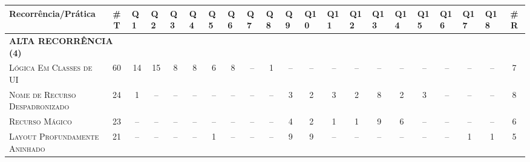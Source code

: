 \begin{table*}
\centering
\footnotesize
\begin{tabular}{@{}p{3.5cm}p{0.3cm}p{.2cm}p{.2cm}p{.2cm}p{.2cm}p{.2cm}p{.2cm}p{.2cm}p{.2cm}p{.2cm}p{.4cm}p{.4cm}p{.4cm}p{.4cm}p{.4cm}p{.4cm}p{.4cm}p{.4cm}p{.4cm}p{0.2cm}@{}}
\toprule
\textbf{Recorrência/Prática} & \multicolumn{1}{c}{\textbf{\#T}} & Q1 & Q2 & Q3 & Q4 & Q5 & Q6 & Q7 & Q8 & Q9 & Q10 & Q11 & Q12 & Q13 & Q14 & Q15 & Q16 & Q17 & Q18 &  \multicolumn{1}{c}{\textbf{\#R}} \\
\hline
\multicolumn{2}{l}{\scriptsize{\textbf{ALTA RECORRÊNCIA (4)}}} \\
\textsc{Lógica Em Classes de UI}					& \multicolumn{1}{c}{60} 	& \multicolumn{1}{c}{14} 	& \multicolumn{1}{c}{15} 	& \multicolumn{1}{c}{8}		& \multicolumn{1}{c}{8}		& \multicolumn{1}{c}{6}		& \multicolumn{1}{c}{8}		& \multicolumn{1}{c}{--}	& \multicolumn{1}{c}{1}		& \multicolumn{1}{c}{--}	& \multicolumn{1}{c}{--}	& \multicolumn{1}{c}{--}	& \multicolumn{1}{c}{--}	& \multicolumn{1}{c}{--}	& \multicolumn{1}{c}{--}	& \multicolumn{1}{c}{--}	& \multicolumn{1}{c}{--}	& \multicolumn{1}{c}{--} 	& \multicolumn{1}{c}{--}	& \multicolumn{1}{c}{7} \\
\textsc{Nome de Recurso Despadronizado}		& \multicolumn{1}{c}{24} 	& \multicolumn{1}{c}{1} 	& \multicolumn{1}{c}{--} 	& \multicolumn{1}{c}{--}	& \multicolumn{1}{c}{--}	& \multicolumn{1}{c}{--}	& \multicolumn{1}{c}{--}	& \multicolumn{1}{c}{--}	& \multicolumn{1}{c}{--}	& \multicolumn{1}{c}{3}		& \multicolumn{1}{c}{2}		& \multicolumn{1}{c}{3}		& \multicolumn{1}{c}{2}		& \multicolumn{1}{c}{8}		& \multicolumn{1}{c}{2}		& \multicolumn{1}{c}{3}		& \multicolumn{1}{c}{--}	& \multicolumn{1}{c}{--} 	& \multicolumn{1}{c}{--}	& \multicolumn{1}{c}{8} \\
\textsc{Recurso Mágico}										& \multicolumn{1}{c}{23} 	& \multicolumn{1}{c}{--} 	& \multicolumn{1}{c}{--} 	& \multicolumn{1}{c}{--}	& \multicolumn{1}{c}{--}	& \multicolumn{1}{c}{--}	& \multicolumn{1}{c}{--}	& \multicolumn{1}{c}{--}	& \multicolumn{1}{c}{--}	& \multicolumn{1}{c}{4}		& \multicolumn{1}{c}{2}		& \multicolumn{1}{c}{1}		& \multicolumn{1}{c}{1}		& \multicolumn{1}{c}{9}		& \multicolumn{1}{c}{6}		& \multicolumn{1}{c}{--}	& \multicolumn{1}{c}{--}	& \multicolumn{1}{c}{--} 	& \multicolumn{1}{c}{--}	& \multicolumn{1}{c}{6} \\
\textsc{Layout Profundamente Aninhado}		& \multicolumn{1}{c}{21} 	& \multicolumn{1}{c}{--} 	& \multicolumn{1}{c}{--} 	& \multicolumn{1}{c}{--}	& \multicolumn{1}{c}{--}	& \multicolumn{1}{c}{1}		& \multicolumn{1}{c}{--}	& \multicolumn{1}{c}{--}	& \multicolumn{1}{c}{--}	& \multicolumn{1}{c}{9}		& \multicolumn{1}{c}{9}		& \multicolumn{1}{c}{--}	& \multicolumn{1}{c}{--}	& \multicolumn{1}{c}{--}	& \multicolumn{1}{c}{--}	& \multicolumn{1}{c}{--}	& \multicolumn{1}{c}{--}	& \multicolumn{1}{c}{1} 	& \multicolumn{1}{c}{1}		& \multicolumn{1}{c}{5} \\


\end{tabular}
\end{table*}
